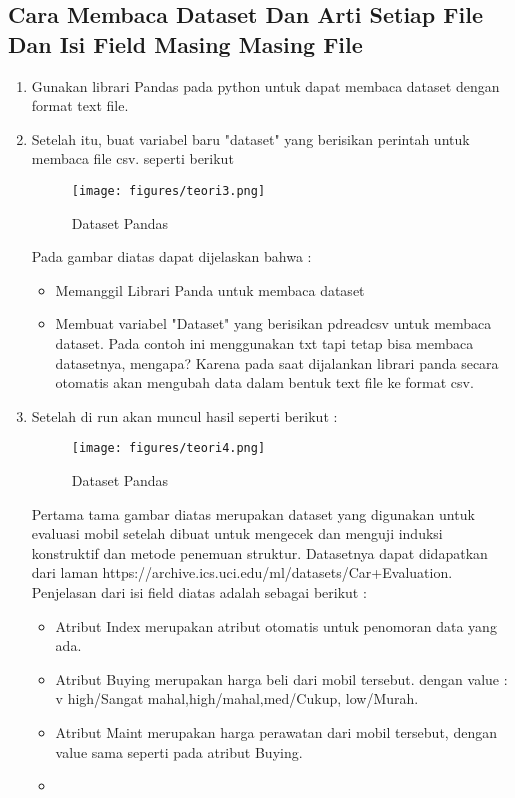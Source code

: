 \subsection{Cara Membaca Dataset Dan Arti Setiap File Dan Isi Field Masing Masing File}
\begin{enumerate}
\item
Gunakan librari Pandas pada python untuk dapat membaca dataset dengan format text file.
\item
Setelah itu, buat variabel baru "dataset" yang berisikan perintah untuk membaca file csv. seperti berikut
\begin{figure}[ht]
\centering
\texttt{[image: figures/teori3.png]}
\caption{Dataset Pandas}
\label{Contoh}
\end{figure}
\par
Pada gambar diatas dapat dijelaskan bahwa :
\begin{itemize}
\item
Memanggil Librari Panda untuk membaca dataset
\item
Membuat variabel "Dataset" yang berisikan pdreadcsv untuk membaca dataset. Pada contoh ini menggunakan txt tapi tetap bisa membaca datasetnya, mengapa? Karena pada saat dijalankan librari panda secara otomatis akan mengubah data dalam bentuk text file ke format csv.
\end{itemize}
\item
Setelah di run akan muncul hasil seperti berikut :
\begin{figure}[ht]
\centering
\texttt{[image: figures/teori4.png]}
\caption{Dataset Pandas}
\label{Contoh}
\end{figure}
\par
Pertama tama gambar diatas merupakan dataset yang digunakan untuk evaluasi mobil setelah dibuat untuk mengecek dan menguji induksi konstruktif dan metode penemuan struktur. Datasetnya dapat didapatkan dari laman https://archive.ics.uci.edu/ml/datasets/Car+Evaluation.
Penjelasan dari isi field diatas adalah sebagai berikut :
\begin{itemize}
\item
Atribut Index merupakan atribut otomatis untuk penomoran data yang ada.
\item
Atribut Buying merupakan harga beli dari mobil tersebut. dengan value : v high/Sangat mahal,high/mahal,med/Cukup, low/Murah.
\item
Atribut Maint merupakan harga perawatan dari mobil tersebut, dengan value sama seperti pada atribut Buying.
\item

\end{itemize}
\end{enumerate}
